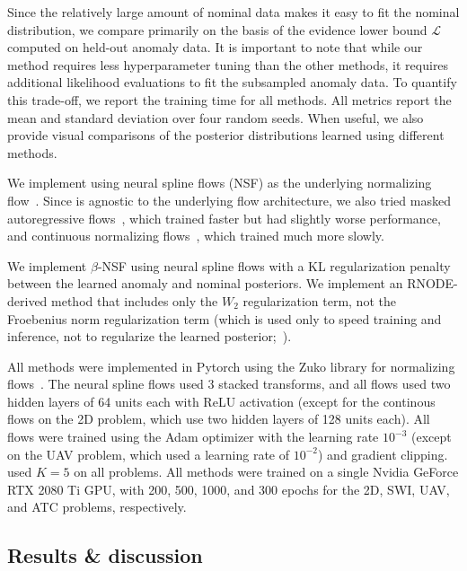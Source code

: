 Since the relatively large amount of nominal data makes it easy to fit the nominal distribution, we compare primarily on the basis of the evidence lower bound $\mathcal{L}$ computed on held-out anomaly data. It is important to note that while our method requires less hyperparameter tuning than the other methods, it requires additional likelihood evaluations to fit the subsampled anomaly data. To quantify this trade-off, we report the training time for all methods. All metrics report the mean and standard deviation over four random seeds. When useful, we also provide visual comparisons of the posterior distributions learned using different methods.

We implement \ouralg{} using neural spline flows (NSF) as the underlying normalizing flow~\cite{durkanNeuralSplineFlows2019}. Since \ouralg{} is agnostic to the underlying flow architecture, we also tried masked autoregressive flows~\cite{huangNeuralAutoregressiveFlows2018}, which trained faster but had slightly worse performance, and continuous normalizing flows~\cite{chenNeuralOrdinaryDifferential2018}, which trained much more slowly.

We implement $\beta$-NSF using neural spline flows with a KL regularization penalty between the learned anomaly and nominal posteriors. We implement an RNODE-derived method that includes only the $W_2$ regularization term, not the Froebenius norm regularization term (which is used only to speed training and inference, not to regularize the learned posterior;~\cite{finlayHowTrainYour2020}).

All methods were implemented in Pytorch using the Zuko library for normalizing flows~\cite{ProbabilistsZuko2024}. The neural spline flows used 3 stacked transforms, and all flows used two hidden layers of 64 units each with ReLU activation (except for the continous flows on the 2D problem, which use two hidden layers of 128 units each). All flows were trained using the Adam optimizer with the learning rate $10^{-3}$ (except on the UAV problem, which used a learning rate of $10^{-2}$) and gradient clipping. \ouralg{} used $K=5$ on all problems. All methods were trained on a single Nvidia GeForce RTX 2080 Ti GPU, with 200, 500, 1000, and 300 epochs for the 2D, SWI, UAV, and ATC problems, respectively.

\subsection{Results \& discussion}

